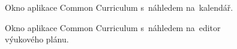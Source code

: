 \documentclass[male,czech,api_bc]{kitheses}
\begin{document}
\begin{figure}[H]
	\centering
	\caption{Okno aplikace Common Curriculum s~náhledem na~kalendář.}
	\label{fig:common-curriculum-1}
\end{figure}
\begin{figure}[H]
	\centering
	\caption{Okno aplikace Common Curriculum s~náhledem na~editor výukového plánu.}
	\label{fig:common-curriculum-2}
\end{figure}
\end{document}
